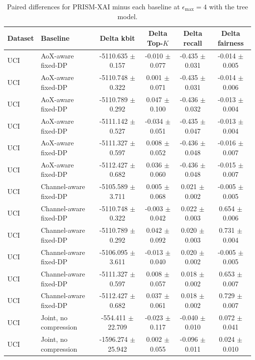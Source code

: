 \begin{table}[t]
\caption{Paired differences for PRISM-XAI minus each baseline at $\epsilon_{\max}=4$ with the tree model.}
\label{tab:paired-differences}
\centering
\scriptsize
\setlength{\tabcolsep}{3pt}
\begin{tabular}{llcccc}
\toprule
Dataset & Baseline & Delta kbit & Delta Top-$K$ & Delta recall & Delta fairness \\
\midrule
UCI & AoX-aware fixed-DP & -5110.635 $\pm$ 0.157 & -0.010 $\pm$ 0.077 & -0.435 $\pm$ 0.031 & -0.014 $\pm$ 0.005 \\
UCI & AoX-aware fixed-DP & -5110.748 $\pm$ 0.322 & 0.001 $\pm$ 0.071 & -0.435 $\pm$ 0.031 & -0.014 $\pm$ 0.006 \\
UCI & AoX-aware fixed-DP & -5110.789 $\pm$ 0.292 & 0.047 $\pm$ 0.100 & -0.436 $\pm$ 0.032 & -0.013 $\pm$ 0.004 \\
UCI & AoX-aware fixed-DP & -5111.142 $\pm$ 0.527 & -0.034 $\pm$ 0.051 & -0.435 $\pm$ 0.047 & -0.013 $\pm$ 0.004 \\
UCI & AoX-aware fixed-DP & -5111.327 $\pm$ 0.597 & 0.008 $\pm$ 0.052 & -0.436 $\pm$ 0.048 & -0.016 $\pm$ 0.007 \\
UCI & AoX-aware fixed-DP & -5112.427 $\pm$ 0.682 & 0.036 $\pm$ 0.060 & -0.436 $\pm$ 0.048 & -0.015 $\pm$ 0.007 \\
UCI & Channel-aware fixed-DP & -5105.589 $\pm$ 3.711 & 0.005 $\pm$ 0.068 & 0.021 $\pm$ 0.002 & -0.005 $\pm$ 0.005 \\
UCI & Channel-aware fixed-DP & -5110.748 $\pm$ 0.322 & -0.003 $\pm$ 0.042 & 0.022 $\pm$ 0.003 & 0.654 $\pm$ 0.006 \\
UCI & Channel-aware fixed-DP & -5110.789 $\pm$ 0.292 & 0.042 $\pm$ 0.092 & 0.020 $\pm$ 0.003 & 0.731 $\pm$ 0.004 \\
UCI & Channel-aware fixed-DP & -5106.095 $\pm$ 3.611 & -0.013 $\pm$ 0.040 & 0.020 $\pm$ 0.002 & -0.005 $\pm$ 0.005 \\
UCI & Channel-aware fixed-DP & -5111.327 $\pm$ 0.597 & 0.008 $\pm$ 0.057 & 0.018 $\pm$ 0.002 & 0.653 $\pm$ 0.007 \\
UCI & Channel-aware fixed-DP & -5112.427 $\pm$ 0.682 & 0.037 $\pm$ 0.061 & 0.018 $\pm$ 0.002 & 0.729 $\pm$ 0.007 \\
UCI & Joint, no compression & -554.411 $\pm$ 22.709 & -0.023 $\pm$ 0.117 & -0.040 $\pm$ 0.010 & 0.072 $\pm$ 0.041 \\
UCI & Joint, no compression & -1596.274 $\pm$ 25.942 & 0.002 $\pm$ 0.055 & -0.096 $\pm$ 0.011 & 0.024 $\pm$ 0.010 \\

\end{tabular}
\end{table}

